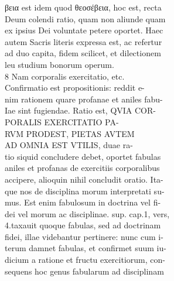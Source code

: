\documentclass{article}
\begin{document}
\begin{pages}
                βεια est idem quod θεοσέβεια, hoc est, recta \\
                Deum colendi ratio, quam non aliunde quam \\
                ex ipsius Dei voluntate petere oportet. Haec \\
                autem Sacris literis expressa est, ac refertur \\
                ad duo capita, fidem scilicet, et dilectionem \\
                leu studium bonorum operum. \\
                8 Nam corporalis exercitatio, etc. \\
                Confirmatio est propositionis: reddit e- \\
                nim rationem quare profanae et aniles fabu- \\
                Iae sint fugiendae. Ratio est, QVIA COR- \\
                PORALIS EXERCITATIO PA- \\
                RVM PRODEST, PIETAS AVTEM \\
                AD OMNIA EST VTILIS, duae ra- \\
                tio siquid concludere debet, oportet fabulas \\
                aniles et profanas de exercitiis corporalibus \\
                accipere, alioquin nihil concludit oratio. Ita- \\
                que nos de disciplina morum interpretati su- \\
                mus. Est enim fabulosum in doctrina vel fi- \\
                dei vel morum ac disciplinae. sup. cap.1, vers, \\
                4.taxauit quoque fabulas, sed ad doctrinam \\
                fidei, illae videbantur pertinere: nunc cum i- \\
                terum damnet fabulas, et confirmet suum iu- \\
                dicium a ratione et fructu exercitiorum, con- \\
                sequens hoc genus fabularum ad disciplinam \\

\end{pages}
\end{document}
